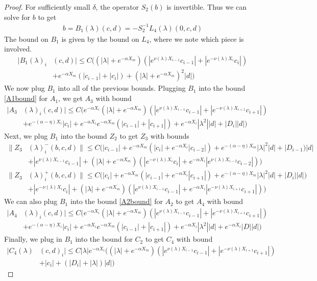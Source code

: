 \documentclass[thesis.tex]{subfiles}
\begin{document}
\begin{lemma}
\begin{proof}
For sufficiently small $\delta$, the operator $S_2(b)$ is invertible. Thus we can solve for $b$ to get
\begin{align}
b = B_1(\lambda)(c,d) 
= -S_2^{-1} L_4(\lambda)(0, c, d)
\end{align}
The bound on $B_1$ is given by the bound on $L_4$, where we note which piece is involved.
\begin{align*}
|B_1(\lambda)_i&(c, d)| \leq C \Big( (|\lambda| + e^{-\alpha X_m})(|e^{\nu(\lambda)X_{i-1}} c_{i-1}| + |e^{-\nu(\lambda)X_i} c_i|) \\
&+ e^{-\alpha X_m}(|c_{i-1}| + |c_i|) + (|\lambda| + e^{-\alpha X_m})^2 |d|  \Big)
\end{align*}
We now plug $B_1$ into all of the previous bounds. Plugging $B_1$ into the bound \eqref{A1bound} for $A_1$, we get $A_3$ with bound
\begin{align*}
|A_3&(\lambda)_i(c, d)|
\leq C \Big(  
e^{-\alpha X_i} (|\lambda| + e^{-\alpha X_m})(|e^{\nu(\lambda)X_{i-1}} c_{i-1}| + |e^{-\nu(\lambda)X_{i+1}}c_{i+1}|) \\
&+ e^{-(\alpha - \eta)X_i}|c_i| + e^{-\alpha X_i} e^{-\alpha X_m}(|c_{i-1}| + |c_{i+1}|) + e^{-\alpha X_i} |\lambda^2||d| + |D_i||d| \Big)
\end{align*} 
Next, we plug $B_1$ into the bound $Z_2$ to get $Z_3$ with bounds
\begin{align*}
\| Z_3&(\lambda)_i^-(b,c,d) \| \leq C\Big(|c_{i-1}| + e^{-\alpha X_m}(|c_i| + e^{-\alpha X_i} |c_{i-2}|) + e^{-(\alpha - \eta) X_m}|\lambda|^2|d| + |D_{i-1})|d| \\
&+ |e^{\nu(\lambda)X_{i-1}}c_{i-1}| + (|\lambda| + e^{-\alpha X_m})(|e^{-\nu(\lambda)X_i} c_i| + e^{-\alpha X_i} |e^{\nu(\lambda)X_{i-2}} c_{i-2}|)\Big) \\
\| Z_3&(\lambda)_i^+(b,c,d) \| \leq C\Big(|c_i| + e^{-\alpha X_m}(|c_{i-1}| + e^{-\alpha X_i} |c_{i+1}|) + e^{-(\alpha - \eta) X_m}|\lambda|^2|d| + |D_i||d|) \\
&+ |e^{-\nu(\lambda)X_i} c_i| + (|\lambda| + e^{-\alpha X_m})(|e^{\nu(\lambda)X_{i-1}} c_{i-1}| + e^{-\alpha X_i} |e^{-\nu(\lambda)X_{i+1}} c_{i+1}|)\Big)
\end{align*}
We can also plug $B_1$ into the bound \eqref{A2bound} for $A_2$ to get $A_4$ with bound
\begin{align*}
|A_4&(\lambda)_i(c, d)|
\leq C \Big(  
e^{-\alpha X_i} (|\lambda| + e^{-\alpha X_m})(|e^{\nu(\lambda)X_{i-1}} c_{i-1}| + |e^{-\nu(\lambda)X_{i+1}}c_{i+1}|) \\
&+ e^{-(\alpha - \eta)X_i}|c_i| + e^{-\alpha X_i} e^{-\alpha X_m}(|c_{i-1}| + |c_{i+1}|) + e^{-\alpha X_i} |\lambda^2||d| + e^{-\alpha X_i}|D||d| \Big)
\end{align*} 
Finally, we plug in $B_1$ into the bound for $C_2$ to get $C_4$ with bound
\begin{align*}
|C_4(\lambda)&(c, d)_i| \leq C |\lambda| e^{-\alpha X_i} \Big( (|\lambda| + e^{-\alpha X_m})(|e^{\nu(\lambda)X_{i-1}} c_{i-1}| + |e^{-\nu(\lambda)X_{i+1}}c_{i+1}|)\\
&+ |c_i| + (|D_i| + |\lambda|)|d| \Big)
\end{align*} 


\end{proof}
\end{lemma}
\end{document}
